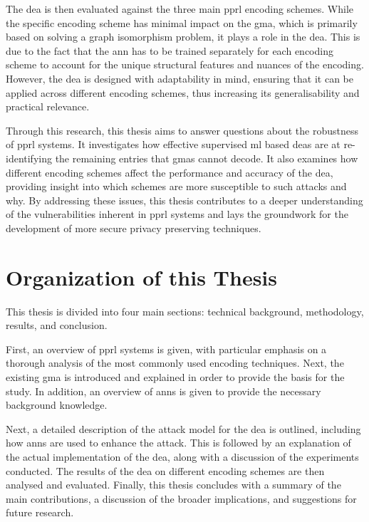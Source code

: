 The \ac{dea} is then evaluated against the three main \ac{pprl} encoding schemes.
While the specific encoding scheme has minimal impact on the \ac{gma}, which is primarily based on solving a graph isomorphism problem, it plays a role in the \ac{dea}.
This is due to the fact that the \ac{ann} has to be trained separately for each encoding scheme to account for the unique structural features and nuances of the encoding.
However, the \ac{dea} is designed with adaptability in mind, ensuring that it can be applied across different encoding schemes, thus increasing its generalisability and practical relevance.

Through this research, this thesis aims to answer questions about the robustness of \ac{pprl} systems.
It investigates how effective supervised \ac{ml} based \ac{dea}s are at re-identifying the remaining entries that \ac{gma}s cannot decode.
It also examines how different encoding schemes affect the performance and accuracy of the \ac{dea}, providing insight into which schemes are more susceptible to such attacks and why.
By addressing these issues, this thesis contributes to a deeper understanding of the vulnerabilities inherent in \ac{pprl} systems and lays the groundwork for the development of more secure privacy preserving techniques.

\section{Organization of this Thesis}  \label{sec:orga}

This thesis is divided into four main sections: technical background, methodology, results, and conclusion.

First, an overview of \ac{pprl} systems is given, with particular emphasis on a thorough analysis of the most commonly used encoding techniques.
Next, the existing \ac{gma} is introduced and explained in order to provide the basis for the study.
In addition, an overview of \ac{ann}s is given to provide the necessary background knowledge.

Next, a detailed description of the attack model for the \ac{dea} is outlined, including how \ac{ann}s are used to enhance the attack.
This is followed by an explanation of the actual implementation of the \ac{dea}, along with a discussion of the experiments conducted.
The results of the \ac{dea} on different encoding schemes are then analysed and evaluated.
Finally, this thesis concludes with a summary of the main contributions, a discussion of the broader implications, and suggestions for future research.